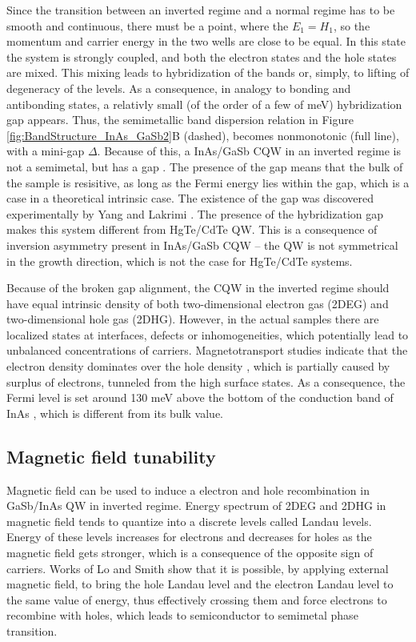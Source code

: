 \documentclass[titlepage,a4paper]{book}
\begin{document}
Since the transition between an inverted regime and a normal regime has to be smooth and continuous, there must be a point, where the $E_1 = H_1$, so the momentum and carrier energy in the two wells are close to be equal. In this state the system is strongly coupled, and both the electron states and the hole states are mixed. This mixing leads to hybridization of the bands or, simply, to lifting of degeneracy of the levels. As a consequence, in analogy to bonding and antibonding states, a relativly small (of the order of a few of meV) hybridization gap appears. Thus, the semimetallic band dispersion relation in Figure \ref{fig:BandStructure_InAs_GaSb2}B (dashed), becomes nonmonotonic (full line), with a mini-gap $\Delta$. Because of this, a InAs/GaSb CQW in an inverted regime is not a semimetal, but has a gap \cite{Altarelli_BandStructure}. The presence of the gap means that the bulk of the sample is resisitive, as long as the Fermi energy lies within the gap, which is a case in a theoretical intrinsic case. The existence of the gap was discovered experimentally by Yang \cite{Yang_BandStructure} and Lakrimi \cite{Lakrimi_BandStructure}. The presence of the hybridization gap makes this system different from HgTe/CdTe QW. This is a consequence of inversion asymmetry present in InAs/GaSb CQW -- the QW is not symmetrical in the growth direction, which is not the case for HgTe/CdTe systems.

Because of the broken gap alignment, the CQW in the inverted regime should have equal intrinsic density of both two-dimensional electron gas (2DEG) and two-dimensional hole gas (2DHG). However, in the actual samples there are localized states at interfaces, defects or inhomogeneities, which potentially lead to unbalanced concentrations of carriers. Magnetotransport studies indicate that the electron density dominates over the hole density \cite{Petchsingh_BandOrdering}\cite{Munekata_BandOrdering}, which is partially caused by surplus of electrons, tunneled from the high surface states. As a consequence, the Fermi level is set around 130 meV above the bottom of the conduction band of InAs \cite{Nguyen_Mobility}, which is different from its bulk value.

\subsection{Magnetic field tunability}
Magnetic field can be used to induce a electron and hole recombination in GaSb/InAs QW in inverted regime. Energy spectrum of 2DEG and 2DHG in magnetic field tends to quantize into a discrete levels called Landau levels. Energy of these levels increases for electrons and decreases for holes as the magnetic field gets stronger, which is a consequence of the opposite sign of carriers. Works of Lo \cite{Lo_MagneticField} and Smith \cite{Smith_MagneticField} show that it is possible, by applying external magnetic field, to bring the hole Landau level and the electron Landau level to the same value of energy, thus effectively crossing them and force electrons to recombine with holes, which leads to semiconductor to semimetal phase transition.
\end{document}
